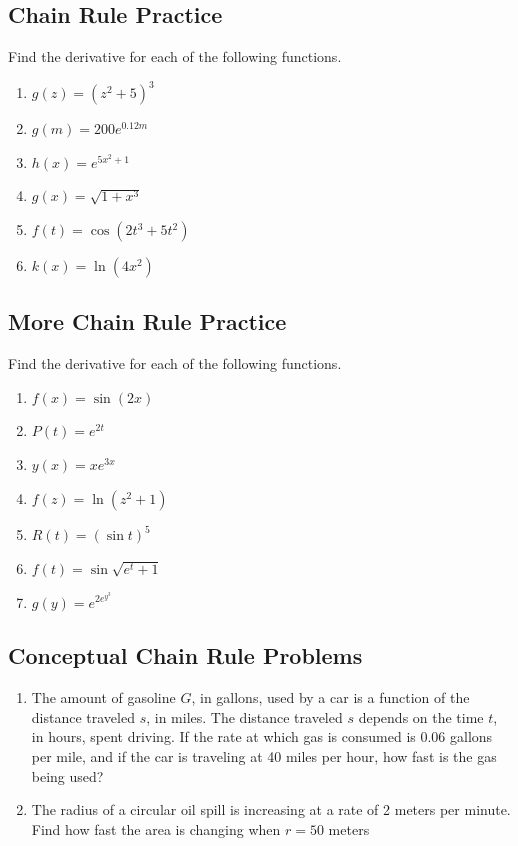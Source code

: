 \documentclass[
]{book}
\providecommand{\tightlist}{%
  \setlength{\itemsep}{0pt}\setlength{\parskip}{0pt}}
\begin{document}
\hypertarget{chain-rule-practice}{%
\subsection{Chain Rule Practice}\label{chain-rule-practice}}

Find the derivative for each of the following functions.

\begin{enumerate}
\def\labelenumi{\arabic{enumi}.}
\tightlist
\item
  \(g(z)=(z^2+5)^3\)
\item
  \(g(m) = 200 e^{0.12m}\)
\item
  \(h(x) = e^{5x^2+1}\)
\item
  \(g(x) = \sqrt{1+x^3}\)
\item
  \(f(t) = \cos(2t^3+5t^2)\)
\item
  \(k(x) = \ln(4x^2)\)
\end{enumerate}

\hypertarget{more-chain-rule-practice}{%
\subsection{More Chain Rule Practice}\label{more-chain-rule-practice}}

Find the derivative for each of the following functions.

\begin{enumerate}
\def\labelenumi{\arabic{enumi}.}
\tightlist
\item
  \(f(x)=\sin(2x)\)
\item
  \(P(t)=e^{2t}\)
\item
  \(y(x)=x e^{3x}\)
\item
  \(f(z)=\ln(z^2+1)\)
\item
  \(R(t)=(\sin t)^5\)
\item
  \(f(t)=\sin \sqrt{e^{t}+1}\)
\item
  \(g(y)=e^{2e^{y^3}}\)
\end{enumerate}

\hypertarget{conceptual-chain-rule-problems}{%
\subsection{Conceptual Chain Rule Problems}\label{conceptual-chain-rule-problems}}

\begin{enumerate}
\def\labelenumi{\arabic{enumi}.}
\tightlist
\item
  The amount of gasoline \(G\), in gallons, used by a car is a function of the distance traveled \(s\), in miles. The distance traveled \(s\) depends on the time \(t\), in hours, spent driving.
  If the rate at which gas is consumed is 0.06 gallons per mile, and if the car is traveling at 40 miles per hour, how fast is the gas being used?
\item
  The radius of a circular oil spill is increasing at a rate of 2 meters per minute. Find how fast the area is changing when \(r=50\) meters
\end{enumerate}
\end{document}
